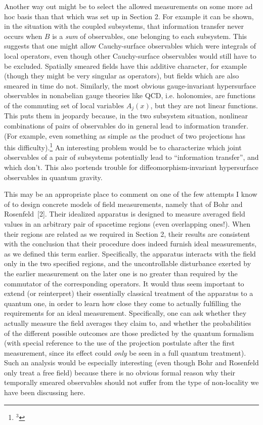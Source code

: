 \tx
Another way out might be to select the allowed measurements on some
more ad hoc basis than that which was set up in Section 2. For example
it can be shown, in the situation with the coupled subsystems, that
information transfer never occurs when $B$ is a {\it sum} of
observables, one belonging to each subsystem.  This suggests that one
might allow Cauchy-surface observables which were integrals of local
operators, even though other Cauchy-surface observables would still
have to be excluded.  Spatially smeared fields have this additive
character, for example (though they might be very singular as
operators), but fields which are also smeared in time do not.
Similarly, the most obvious gauge-invariant hypersurface observables
in nonabelian gauge theories like QCD, i.e. holonomies, are functions
of the commuting set of local variables $A_j(x)$, but they are not
linear functions.  This puts them in jeopardy because, in the two
subsystem situation, nonlinear combinations of pairs of observables do
in general lead to information transfer.  (For example, even something
as simple as the product of two projections has this
difficulty).\footnote{$^3$}
%
{An interesting problem would be to characterize which joint
observables of a pair of subsystems potentially lead to ``information
transfer'', and which don't. \smallskip}
%
This also portends trouble for diffeomorphism-invariant hypersurface
observables in quantum gravity.

\tx
This may be an appropriate place to comment on one of the few attempts I
know of to design concrete models of field measurements, namely that
of Bohr and Rosenfeld~[2].  Their idealized apparatus is designed to
measure averaged field values in an arbitrary pair of spacetime
regions (even overlapping ones!).  When their regions are related as
we required in Section 2, their results are consistent with the
conclusion that their procedure does indeed furnish ideal
measurements, as we defined this term earlier.  Specifically, the
apparatus interacts with the field only in the two specified regions,
and the uncontrollable disturbance exerted by the earlier measurement
on the later one is no greater than required by the commutator of the
corresponding operators.  It would thus seem important to extend (or
reinterpret) their essentially classical treatment of the apparatus to
a quantum one, in order to learn how close they come to actually
fulfilling the requirements for an ideal measurement.  Specifically,
one can ask whether they actually measure the field averages they
claim to, and whether the probabilities of the different possible
outcomes are those predicted by the quantum formalism (with special
reference to the use of the projection postulate after the first
measurement, since its effect could {\it only} be seen in a full
quantum treatment).  Such an analysis would be especially interesting
(even though Bohr and Rosenfeld only treat a free field) because there
is no obvious formal reason why their temporally smeared observables
should not suffer from the type of non-locality we have been
discussing here.

